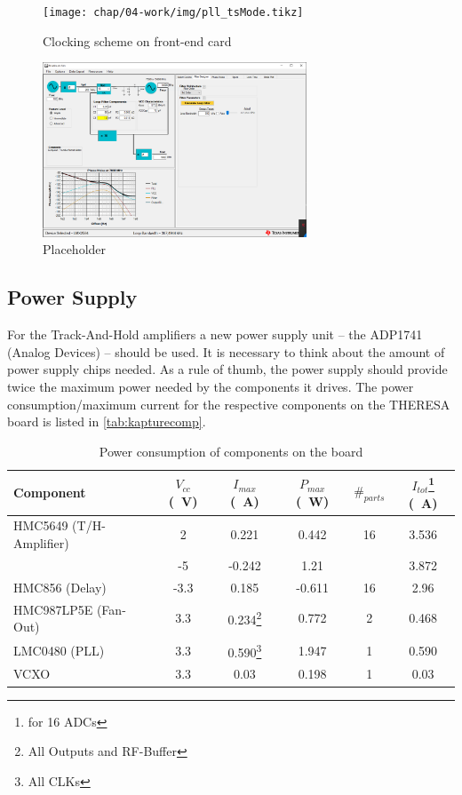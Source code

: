 \begin{figure}[tbh]
	\centering
	\texttt{[image: chap/04-work/img/pll\_tsMode.tikz]}
	\caption{Clocking scheme on front-end card}
	\label{fig:clocking}
\end{figure}


\begin{figure}[tbh]
	\centering
	\includegraphics[width = 0.7\textwidth]{chap/04-work/img/pll.png}
	\caption{Placeholder}
	\label{fig:pll}
\end{figure}



\subsection{Power Supply}
For the Track-And-Hold amplifiers a new power supply unit -- the ADP1741 (Analog Devices) -- should be used. It is necessary to think about the amount of power supply chips needed. As a rule of thumb, the power supply should provide twice the maximum power needed by the components it drives. The power consumption/maximum current for the respective components on the THERESA board is listed in \autoref{tab:kapturecomp}. 
\begin{table}[tbh]
	\caption{Power consumption of components on the board}
	\label{tab:kapturecomp}
	\begin{minipage}{\textwidth}
		\centering
		\begin{tabularx}{\textwidth}{XSSSSS}
			\toprule
			\textbf{Component} & \textbf{$V_{cc}$ (\SI{}{\volt})} & \textbf{$I_{max}$ (\SI{}{\ampere})} & \textbf{$P_{max}$ (\SI{}{\watt})} & $\#_{parts}$ & \textbf{$I_{tot}$}\footnote{for 16 ADCs} (\SI{}{\ampere})\\
			\midrule
			HMC5649 (T/H-Amplifier) 	& 2	  	& 0.221 	 & 0.442 & 16 & 3.536\\
			& -5  	& -0.242 & 1.21 &  & 3.872\\
			HMC856 (Delay) 			& -3.3	& 0.185 & -0.611 & 16 & 2.96\\
			HMC987LP5E (Fan-Out) 	& 3.3 	& 0.234\footnote{All Outputs and RF-Buffer} & 0.772 & 2 & 0.468\\
			LMC0480 (PLL) 			& 3.3 	& 0.590\footnote{All CLKs} & 1.947 & 1 & 0.590\\
			VCXO 					& 3.3 	& 0.03 & 0.198 & 1 & 0.03\\
			\bottomrule
		\end{tabularx}
	\end{minipage}
\end{table}

